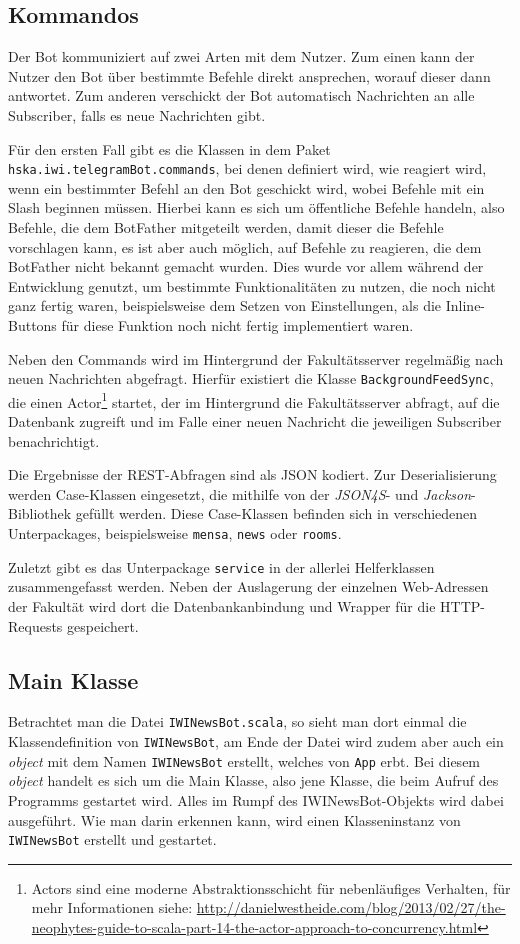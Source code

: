 \subsection{Kommandos}
Der Bot kommuniziert auf zwei Arten mit dem Nutzer. Zum einen kann der Nutzer den Bot über bestimmte Befehle direkt ansprechen, worauf dieser dann antwortet. Zum anderen verschickt der Bot automatisch Nachrichten an alle Subscriber, falls es neue Nachrichten gibt.

Für den ersten Fall gibt es die Klassen in dem Paket \texttt{hska\allowbreak.iwi\allowbreak.telegramBot\allowbreak.commands}, bei denen definiert wird, wie reagiert wird, wenn ein bestimmter Befehl an den Bot geschickt wird, wobei Befehle mit ein Slash beginnen müssen. Hierbei kann es sich um öffentliche Befehle handeln, also Befehle, die dem BotFather mitgeteilt werden, damit dieser die Befehle vorschlagen kann, es ist aber auch möglich, auf Befehle zu reagieren, die dem BotFather nicht bekannt gemacht wurden. Dies wurde vor allem während der Entwicklung genutzt, um bestimmte Funktionalitäten zu nutzen, die noch nicht ganz fertig waren, beispielsweise dem Setzen von Einstellungen, als die Inline-Buttons für diese Funktion noch nicht fertig implementiert waren.

Neben den Commands wird im Hintergrund der Fakultätsserver regelmäßig nach neuen Nachrichten abgefragt. Hierfür existiert die Klasse \texttt{BackgroundFeedSync}, die einen Actor\footnote{Actors sind eine moderne Abstraktionsschicht für nebenläufiges Verhalten, für mehr Informationen siehe: \url{http://danielwestheide.com/blog/2013/02/27/the-neophytes-guide-to-scala-part-14-the-actor-approach-to-concurrency.html}} startet, der im Hintergrund die Fakultätsserver abfragt, auf die Datenbank zugreift und im Falle einer neuen Nachricht die jeweiligen Subscriber benachrichtigt.

Die Ergebnisse der REST-Abfragen sind als JSON kodiert. Zur Deserialisierung werden Case-Klassen eingesetzt, die mithilfe von der \emph{JSON4S}- und \emph{Jackson}-Bibliothek gefüllt werden. Diese Case-Klassen befinden sich in verschiedenen Unterpackages, beispielsweise \texttt{mensa}, \texttt{news} oder \texttt{rooms}.

Zuletzt gibt es das Unterpackage \texttt{service} in der allerlei Helferklassen zusammengefasst werden. Neben der Auslagerung der einzelnen Web-Adressen der Fakultät wird dort die Datenbankanbindung und Wrapper für die HTTP-Requests gespeichert.

\subsection{Main Klasse}\label{sec:Programmstart}
Betrachtet man die Datei \texttt{IWINewsBot.scala}, so sieht man dort einmal die Klassendefinition von \texttt{IWINewsBot}, am Ende der Datei wird zudem aber auch ein \emph{object} mit dem Namen \texttt{IWINewsBot} erstellt, welches von \texttt{App} erbt. Bei diesem \emph{object} handelt es sich um die Main Klasse, also jene Klasse, die beim Aufruf des Programms gestartet wird. Alles im Rumpf des IWINewsBot-Objekts wird dabei ausgeführt. Wie man darin erkennen kann, wird einen Klasseninstanz von \texttt{IWINewsBot} erstellt und gestartet.

